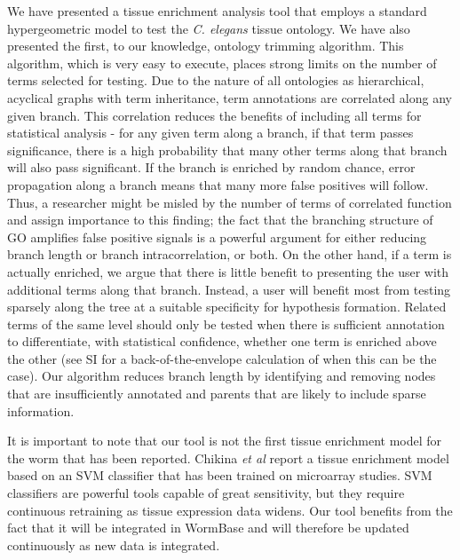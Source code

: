 \documentclass[linenumbers, doublespacing]{bmcart}
\begin{document}
We have presented a tissue enrichment analysis tool that employs a standard hypergeometric model to test the \emph{C. elegans} tissue ontology. We have also presented the first, to our knowledge, ontology trimming algorithm. This algorithm, which is very easy to execute, places strong limits on the number of terms selected for testing. Due to the nature of all ontologies as hierarchical, acyclical graphs with term inheritance, term annotations are correlated along any given branch. This correlation reduces the benefits of including all terms for statistical analysis - for any given term along a branch, if that term passes significance, there is a high probability that many other terms along that branch will also pass significant. If the branch is enriched by random chance, error propagation along a branch means that many more false positives will follow. Thus, a researcher might be misled by the number of terms of correlated function and assign importance to this finding; the fact that the branching structure of GO amplifies false positive signals is a powerful argument for either reducing branch length or branch intracorrelation, or both. On the other hand, if a term is actually enriched, we argue that there is little benefit to presenting the user with additional terms along that branch. Instead, a user will benefit most from testing sparsely along the tree at a suitable specificity for hypothesis formation. Related terms of the same level should only be tested when there is sufficient annotation to differentiate, with statistical confidence, whether one term is enriched above the other (see SI for a back-of-the-envelope calculation of when this can be the case). Our algorithm reduces branch length by identifying and removing nodes that are insufficiently annotated and parents that are likely to include sparse information. 

It is important to note that our tool is not the first tissue enrichment model for the worm that has been reported. Chikina \emph{et al} \cite{Chikina2009} report a tissue enrichment model based on an SVM classifier that has been trained on microarray studies. SVM classifiers are powerful tools capable of great sensitivity, but they require continuous retraining as tissue expression data widens. Our tool benefits from the fact that it will be integrated in WormBase and will therefore be updated continuously as new data is integrated.  
\end{document}
